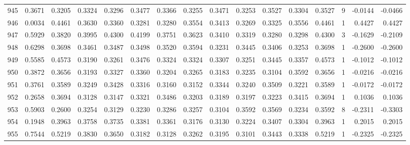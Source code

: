 \begin{tabular}{lrrrrrrrrrrrrrrr}
945 &      0.3671 &  0.3205 &  0.3324 &  0.3296 &  0.3477 &  0.3366 &  0.3255 &  0.3471 &  0.3253 &  0.3527 &   0.3304 &     0.3527 &      9 &                   -0.0144 &                    -0.0466 \\
946 &      0.0034 &  0.4461 &  0.3630 &  0.3360 &  0.3281 &  0.3280 &  0.3554 &  0.3413 &  0.3269 &  0.3325 &   0.3556 &     0.4461 &      1 &                    0.4427 &                     0.4427 \\
947 &      0.5929 &  0.3820 &  0.3995 &  0.4300 &  0.4199 &  0.3751 &  0.3623 &  0.3410 &  0.3319 &  0.3280 &   0.3298 &     0.4300 &      3 &                   -0.1629 &                    -0.2109 \\
948 &      0.6298 &  0.3698 &  0.3461 &  0.3487 &  0.3498 &  0.3520 &  0.3594 &  0.3231 &  0.3445 &  0.3406 &   0.3253 &     0.3698 &      1 &                   -0.2600 &                    -0.2600 \\
949 &      0.5585 &  0.4573 &  0.3190 &  0.3261 &  0.3476 &  0.3324 &  0.3324 &  0.3307 &  0.3251 &  0.3445 &   0.3357 &     0.4573 &      1 &                   -0.1012 &                    -0.1012 \\
950 &      0.3872 &  0.3656 &  0.3193 &  0.3327 &  0.3360 &  0.3204 &  0.3265 &  0.3183 &  0.3235 &  0.3104 &   0.3592 &     0.3656 &      1 &                   -0.0216 &                    -0.0216 \\
951 &      0.3761 &  0.3589 &  0.3249 &  0.3428 &  0.3316 &  0.3160 &  0.3152 &  0.3344 &  0.3240 &  0.3509 &   0.3221 &     0.3589 &      1 &                   -0.0172 &                    -0.0172 \\
952 &      0.2658 &  0.3694 &  0.3128 &  0.3147 &  0.3321 &  0.3486 &  0.3203 &  0.3189 &  0.3197 &  0.3223 &   0.3415 &     0.3694 &      1 &                    0.1036 &                     0.1036 \\
953 &      0.5903 &  0.2600 &  0.3254 &  0.3129 &  0.3230 &  0.3286 &  0.3257 &  0.3104 &  0.3592 &  0.3569 &   0.3234 &     0.3592 &      8 &                   -0.2311 &                    -0.3303 \\
954 &      0.1948 &  0.3963 &  0.3758 &  0.3735 &  0.3381 &  0.3361 &  0.3176 &  0.3130 &  0.3224 &  0.3407 &   0.3304 &     0.3963 &      1 &                    0.2015 &                     0.2015 \\
955 &      0.7544 &  0.5219 &  0.3830 &  0.3650 &  0.3182 &  0.3128 &  0.3262 &  0.3195 &  0.3101 &  0.3443 &   0.3338 &     0.5219 &      1 &                   -0.2325 &                    -0.2325 \\

\end{tabular}
